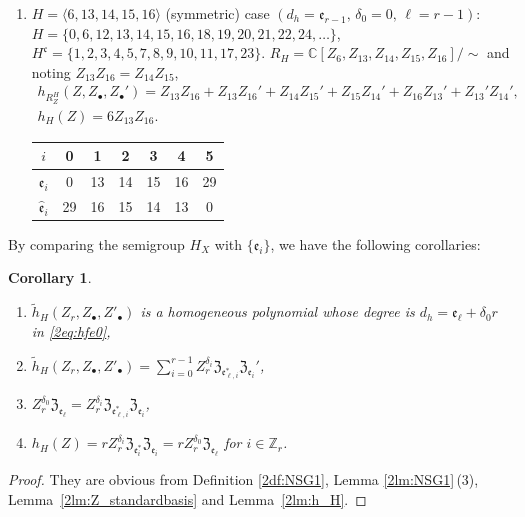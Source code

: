 \documentclass[10pt,a4paper]{amsart}
\def\CC{{\mathbb C}}
\def\ZZ{{\mathbb Z}}
\def\fZ{{\mathfrak Z}}
\def\fc{{\mathfrak c}}
\def\fe{{\mathfrak e}}
\def\th{{\widetilde h}}
\def\hfe{{\widehat{\mathfrak e}}}
\numberwithin{equation}{section}
\newtheorem{Corollary}[Theorem]{Corollary}
\begin{document}
\begin{Example}
\begin{enumerate}
\item $H=\langle 6, 13, 14, 15, 16\rangle$ (symmetric) case
$(d_h=\fe_{r-1},\, \delta_0=0, \, \ell=r-1)$:
$H = \{0, 6, 12, 13, 14, \allowbreak 15, 16, 18, 19, 20, 21, 22, 24, \dots\}$,
$H^\fc = \{1, 2, 3, 4, 5, 7, 8, 9, 10, 11, 17, 23\}$.
$R_H = \CC[Z_6, Z_{13},\allowbreak Z_{14}, Z_{15}, Z_{16}]/ {\sim} $ and noting
$Z_{13}Z_{16}=Z_{14}Z_{15}$,
\begin{gather*}
h_{{R_Z^H}}(Z, Z_\bullet, Z_\bullet')=
Z_{13}Z_{16} +Z_{13}Z_{16}'+Z_{14}Z_{15}'+Z_{15}Z_{14}'
+Z_{16}Z_{13}'+Z_{13}'Z_{14}',\\
h_H(Z) = 6 Z_{13}Z_{16}.
\end{gather*}
\begin{table}[htb]\centering
 \begin{tabular}{|c|cccccc|}
\hline
$i$&0&1&2&3&4&5\\
\hline
$\fe_i$ &0 &13 & 14& 15 &16 & 29\\
$\hfe_i$ &29 &16 & 15& 14 &13 & 0\\
\hline
 \end{tabular}
\end{table}\label{2tb:Ex6}
\end{enumerate}
\end{Example}

By comparing the semigroup $H_X$ with $\{\fe_i\}$, we have the following corollaries:

\begin{Corollary}\label{2cr:h_Hhomo}\quad
\begin{enumerate}\itemsep=0pt
\item[$(1)$] $\th_{H}(Z_r, Z_\bullet, Z'_\bullet)$ is a homogeneous polynomial whose degree is $d_h=\fe_\ell+\delta_0 r$ in \eqref{2eq:hfe0},

\item[$(2)$]
$\th_{H}(Z_r, Z_\bullet, Z'_\bullet)
=\sum_{i=0}^{r-1}
Z_r^{\delta_i} \fZ_{\fe_{\ell,i}^*} \fZ_{\fe_i}'$,

\item[$(3)$]
$Z_r^{\delta_0} \fZ_{\fe_\ell}=Z_r^{\delta_i} \fZ_{\fe_{\ell,i}^*} \fZ_{\fe_i}$,

\item[$(4)$]
$h_{H}(Z)=r Z_r^{\delta_i} \fZ_{\fe_i^*}\fZ_{\fe_i}= r Z_r^{\delta_0} \fZ_{\fe_\ell}$ for $i\in \ZZ_r$.
\end{enumerate}
\end{Corollary}

\begin{proof}
They are obvious from Definition \ref{2df:NSG1}, Lemma \ref{2lm:NSG1}\,(3),
 Lemma~\ref{2lm:Z_standardbasis} and Lemma~\ref{2lm:h_H}.
\end{proof}
\end{document}
